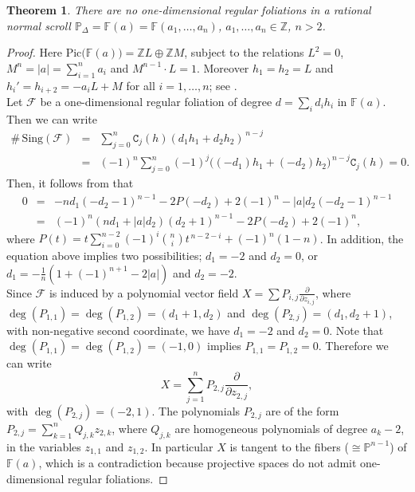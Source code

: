 \documentclass[11pt]{amsart}
\theoremstyle{plain}
\newtheorem{teo}{Theorem}[section]
\theoremstyle{definition}
\begin{document}
\begin{teo} \label{ttee}
There are no one-dimensional regular foliations in a rational normal scroll $\mathbb{P}_{\Delta}=\mathbb{F}(a)=
\mathbb{F}(a_1,\ldots,a_n)$, $a_1,\ldots,a_n\in\mathbb{Z}$, $n>2$. 
\end{teo}
\begin{proof}
Here $\mathrm{Pic}\big(\mathbb{F}(a)\big)=\mathbb{Z}L\oplus\mathbb{Z}M$, 
subject to the relations $L^2=0$, $M^n=\left|a\right|=\sum_{i=1}^n a_i$ and $M^{n-1}\cdot L=1$. Moreover
$h_1=h_2=L$ and $h_i'=h_{i+2}=-a_iL+M$ for all $i=1,\ldots,n$; see \cite{Re}. \\

Let $\mathcal{F}$ be a one-dimensional regular foliation of degree $d=\sum_{i}d_{i} h_i$ in $\mathbb{F}(a)$.
Then we can write
\begin{eqnarray*}
\#\,\mathrm{Sing}(\mathcal{F})&=&\sum_{j=0}^{n}\texttt{C}_j(h)(d_1h_1+d_2h_2)^{\,n-j} \\
&=&(-1)^n\sum_{j=0}^{n}(-1)^j\big((-d_1)h_1+(-d_2)h_2\big)^{\,n-j}\texttt{C}_j(h)=0.	
\end{eqnarray*}
Then, it follows from \cite[p.22]{Mig2} that 
\begin{eqnarray*}
0&=&-nd_1\left(-d_2-1\right)^{n-1}-2P(-d_2)+2(-1)^n -\left|a\right| d_2 \left(-d_2-1\right)^{n-1} \\
&=& (-1)^n\left(nd_1+\left|a\right|d_2\right)\left(d_2+1\right)^{n-1}-2P(-d_2)+2(-1)^n,
\end{eqnarray*}
where $P(t)=t\sum_{i=0}^{n-2}(-1)^{i}\binom{n}{i}t^{\,n-2-i}+(-1)^n(1-n)$.
In addition, the equation above implies two possibilities; $d_1=-2$ and $d_2=0$, or 
$d_1=-\frac{1}{n}(1+(-1)^{n+1}-2\left|a\right|)$ and $d_2=-2$. \\

Since $\mathcal{F}$ is induced by a polynomial vector field $X=\sum P_{i,j}\frac{\partial}{\partial z_{i,j}}$, where 
$\deg(P_{1,1})=\deg(P_{1,2})=(d_1+1,d_2)$ and $\deg(P_{2,j})=(d_1,d_2+1)$, with non-negative second coordinate, we
have $d_1=-2$ and $d_2=0$. Note that $\deg(P_{1,1})=\deg(P_{1,2})=(-1,0)$ implies $P_{1,1}=P_{1,2}=0$.
Therefore we can write 
$$X=\sum_{j=1}^n P_{2,j}\frac{\partial}{\partial z_{2,j}},$$
with $\deg(P_{2,j})=(-2,1)$. The polynomials $P_{2,j}$ are of the form $P_{2,j}=\sum_{k=1}^n Q_{j,k}z_{2,k}$, where $Q_{j,k}$ 
are homogeneous polynomials of degree $a_k-2$, in the variables $z_{1,1}$ and $z_{1,2}$.
In particular $X$ is tangent to the fibers ($\cong\mathbb{P}^{n-1}$) of $\mathbb{F}(a)$, which is a contradiction
because projective spaces do not admit one-dimensional regular foliations. 
\end{proof}
\end{document}
